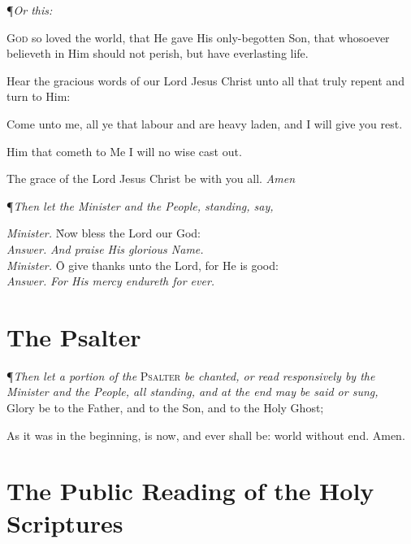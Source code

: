 {\centering \P \textit{Or this:} \par}
\vspace{1ex}

\lettrine{G}{od} so loved the world, that He gave His only-begotten Son, that whosoever believeth in Him should not perish, but have everlasting life.

Hear the gracious words of our Lord Jesus Christ unto all that truly repent and turn to Him:

Come unto me, all ye that labour and are heavy laden, and I will give you rest.

Him that cometh to Me I will no wise cast out.

The grace of the Lord Jesus Christ be with you all. \textit{Amen}

\vspace{2ex}

{\centering \P \textit{Then let the Minister and the People, standing, say,} \par}
\vspace{-2ex}
\begin{tabbing}
	\textit{Minister.} \= Now bless the Lord our God: \\
	\textit{Answer.} \> \textit{And praise His glorious Name.} \\
	\textit{Minister.} \= O give thanks unto the Lord, for He is good: \\
	\textit{Answer.} \> \textit{For His mercy endureth for ever.} \\
\end{tabbing}

\section*{The Psalter}

\P \textit{Then let a portion of the} \textsc{Psalter} \textit{be chanted, or read responsively by the Minister and the People, all standing, and at the end may be said or sung,} \\

Glory be to the Father, and to the Son, and to the Holy Ghost; \par
As it was in the beginning, is now, and ever shall be: world without end. Amen.

\section*{The Public Reading of the Holy Scriptures}

